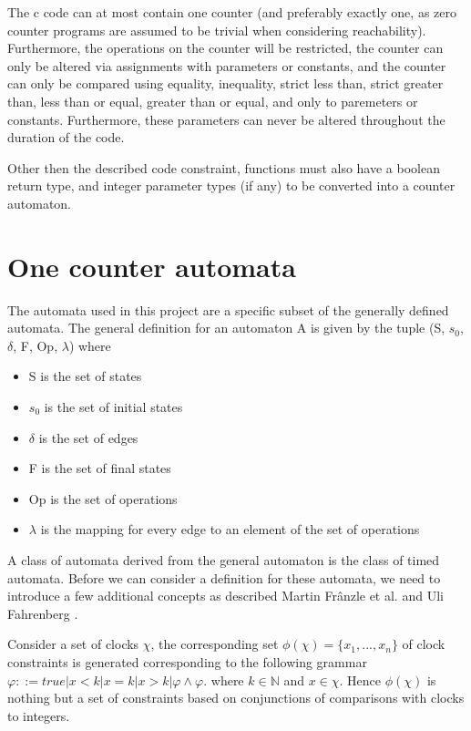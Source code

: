 \documentclass[12pt]{article}
\begin{document}
The c code can at most contain one counter (and preferably exactly one, as zero counter programs are assumed to be trivial when considering reachability). Furthermore, the operations on the counter will be restricted, the counter can only be altered via assignments with parameters or constants, and the counter can only be compared using equality, inequality, strict less than, strict greater than, less than or equal, greater than or equal, and only to paremeters or constants. Furthermore, these parameters can never be altered throughout the duration of the code.

Other then the described code constraint, functions must also have a boolean return type, and integer parameter types (if any) to be converted into a counter automaton.

\section{One counter automata}
The automata used in this project are a specific subset of the generally defined automata. The general definition for an automaton A is given by the tuple (S, $s_0$, $\delta$, F, Op, $\lambda$) where
\begin{itemize}
	\item S is the set of states
	\item $s_0$ is the set of initial states
	\item $\delta$ is the set of edges
	\item F is the set of final states
	\item Op is the set of operations
	\item $\lambda$ is the mapping for every edge to an element of the set of operations
\end{itemize}

A class of automata derived from the general automaton is the class of timed automata. Before we can consider a definition for these automata, we need to introduce a few additional concepts as described Martin Fr\^anzle et al. \cite{informationprocessingletters} and Uli Fahrenberg \cite{higherdimensionaltimedautomata}.

Consider a set of clocks $\chi$, the corresponding set $\phi(\chi)=\{x_1,...,x_n\}$ of clock constraints is generated corresponding to the following grammar $\varphi ::= true | x<k | x = k | x>k | \varphi\land\varphi$. where $k \in \mathbb{N}$ and $x \in \chi$. Hence $\phi(\chi)$ is nothing but a set of constraints based on conjunctions of comparisons with clocks to integers.
\end{document}
